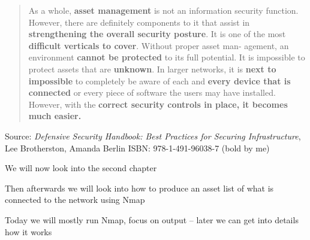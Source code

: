 \documentclass[Screen16to9,17pt]{foils}
\begin{document}


\begin{quote}
As a whole, {\bf asset management} is not an information security function. However,
there are definitely components to it that assist in {\bf strengthening the overall security
posture}. It is one of the most {\bf difficult verticals to cover}. Without proper asset man‐
agement, an environment {\bf cannot be protected} to its full potential. It is impossible to
protect assets that are {\bf unknown}. In larger networks, it is {\bf next to impossible}
to completely be aware of each and {\bf every device that is connected} or every piece of software
the users may have installed. However, with the {\bf correct security controls in place, it
becomes much easier.}
\end{quote}
Source: \emph{Defensive Security Handbook: Best Practices for Securing Infrastructure}, Lee Brotherston, Amanda Berlin ISBN: 978-1-491-96038-7
(bold by me)

\begin{list2}
\item We will now look into the second chapter
\item Then afterwards we will look into how to produce an asset list of what is connected to the network using Nmap
\item Today we will mostly run Nmap, focus on output -- later we can get into details how it works
\end{list2}







\slidenext
\end{document}
